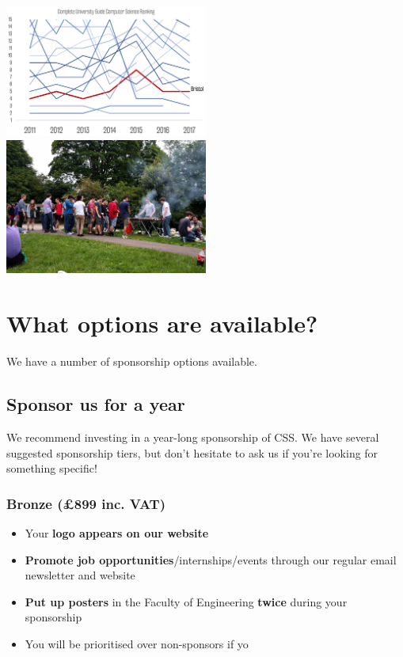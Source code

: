 \documentclass[]{article}
\begin{document}
\includegraphics[width=0.5\textwidth]{ranking-chart}  \includegraphics[width=0.5\textwidth]{bbq}

\section*{What options are available?}

We have a number of sponsorship options available. 

\subsection*{Sponsor us for a year}

We recommend investing in a year-long sponsorship of CSS. We have several suggested sponsorship tiers, but don't hesitate to ask us if you're looking for something specific!

\subsubsection*{Bronze {\color{Sienna}(\pounds 899 inc. VAT)}}

\begin{itemize}
	\item Your \textbf{logo appears on our website}
	\item \textbf{Promote job opportunities}/internships/events through our regular email newsletter and website
	\item \textbf{Put up posters} in the Faculty of Engineering \textbf{twice} during your sponsorship
    \item You will be prioritised over non-sponsors if yo
\end{itemize}
\end{document}
